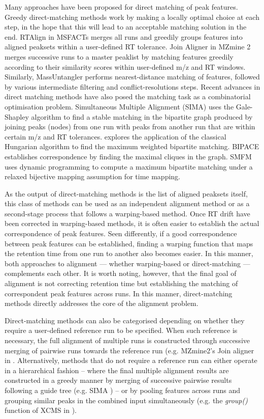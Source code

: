 Many approaches have been proposed for direct matching of peak features. Greedy direct-matching methods work by making a locally optimal choice at each step, in the hope that this will lead to an acceptable matching solution in the end. RTAlign in MSFACTs \cite{Duran2003} merges all runs and greedily groups features into aligned peaksets within a user-defined RT tolerance. Join Aligner \cite{Pluskal2010} in MZmine 2 merges successive runs to a master peaklist by matching features greedily according to their similarity scores within user-defined m/z and RT windows. Similarly, MassUntangler \cite{Ballardini2011} performs nearest-distance matching of features, followed by various intermediate filtering and conflict-resolutions steps. Recent advances in direct matching methods have also posed the matching task as a combinatorial optimisation problem. Simultaneous Multiple Alignment (SIMA) \cite{Voss2011a} uses the Gale-Shapley algorithm to find a stable matching in the bipartite graph produced by joining peaks (nodes) from one run with peaks from another run that are within certain m/z and RT tolerances. \cite{Wang2013} explores the application of the classical Hungarian algorithm to find the maximum weighted bipartite matching. BIPACE \cite{Hoffmann2012a} establishes correspondence by finding the maximal cliques in the graph. SMFM \cite{Lin2013} uses dynamic programming to compute a maximum bipartite matching under a relaxed bijective mapping assumption for time mapping.

As the output of direct-matching methods is the list of aligned peaksets itself, this class of methods can be used as an independent alignment method or as a second-stage process that follows a warping-based method. Once RT drift have been corrected in warping-based methods, it is often easier to establish the actual correspondence of peak features. Seen differently, if a good correspondence between peak features can be established, finding a warping function that maps the retention time from one run to another also becomes easier. In this manner, both approaches to alignment --- whether warping-based or direct-matching --- complements each other. It is worth noting, however, that the final goal of alignment is not correcting retention time but establishing the matching of correspondent peak features across runs. In this manner, direct-matching methods directly addresses the core of the alignment problem.

Direct-matching methods can also be categorised depending on whether they require a user-defined reference run to be specified. When such reference is necessary, the full alignment of multiple runs is constructed through successive merging of pairwise runs towards the reference run (e.g. MZmine2's Join aligner in \cite{Pluskal2010}. Alternatively, methods that do not require a reference run can either operate in a hierarchical fashion -- where the final multiple alignment results are constructed in a greedy manner by merging of successive pairwise results following a guide tree (e.g. SIMA \cite{Voss2011a}) -- or by pooling features across runs and grouping similar peaks in the combined input simultaneously (e.g. the \textit{group()} function of XCMS in \cite{Smith2006}).

